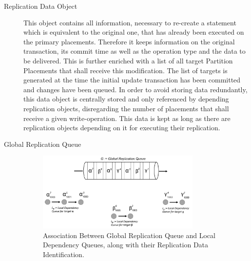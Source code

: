 \begin{description}

    \item[Replication Data Object] This object contains all information, necessary to re-create a statement which is equivalent to the original one,
    that has already been executed on the primary placements. 
    Therefore it keeps information on the original transaction, its commit time as well as the operation type and the data to be delivered. 
    This is further enriched with a list of all target Partition Placements that shall receive this modification. The list of targets is generated
    at the time the initial update transaction has been committed and changes have been queued. In order to avoid storing data redundantly, this data object 
    is centrally stored and only referenced by depending replication objects, disregarding the number of placements that shall receive a given write-operation.
    This data is kept as long as there are replication objects depending on it for executing their replication.


    \item[Global Replication Queue] 
    
    \begin{figure}[t]
        \centering
        \includegraphics[width=0.8\textwidth]{Figures/Queue.png}
        \caption{Association Between Global Replication Queue and Local Dependency Queues, along with their Replication Data Identification.}
        \label{fig:queue}
    \end{figure}
  

\end{description}
